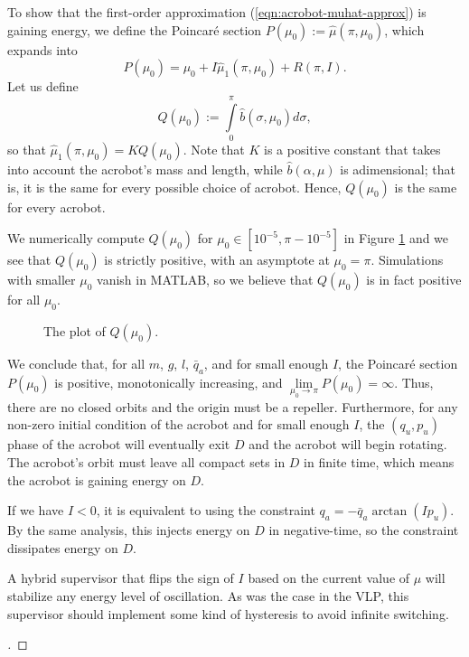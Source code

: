To show that the first-order approximation (\ref{eqn:acrobot-muhat-approx}) is
gaining energy, we define the Poincar\'{e} section 
\(P(\mu_0) := \hat{\mu}(\pi,\mu_0)\), which expands into
\[
    P(\mu_0) = \mu_0 + I \hat{\mu}_1(\pi,\mu_0) + R(\pi,I)
    .
\]
Let us define
\[
    Q(\mu_0) := \int \limits_0^\pi \hat{b}(\sigma,\mu_0)d\sigma
    ,
\]
so that \(\hat{\mu}_1(\pi,\mu_0) = K Q(\mu_0)\).
Note that \(K\) is a positive constant that takes into account the acrobot's
mass and length, while \(\hat{b}(\alpha,\mu)\) is adimensional;
that is, it is the same for every possible choice of acrobot.
Hence, \(Q(\mu_0)\) is the same for every acrobot.

We numerically compute \(Q(\mu_0)\) for \(\mu_0 \in [10^{-5}, \pi - 10^{-5}]\)
in Figure \ref{fig:acrobot-Q} and we see that \(Q(\mu_0)\) is strictly positive,
with an asymptote at \(\mu_0 = \pi\). 
Simulations with smaller \(\mu_0\) vanish in MATLAB, so we believe that 
\(Q(\mu_0)\) is in fact positive for all \(\mu_0\).

\begin{figure}
    \centering
    \caption{The plot of \(Q(\mu_0)\).}
    \label{fig:acrobot-Q}
\end{figure}

We conclude that, for all \(m\), \(g\), \(l\), \(\bar{q}_a\), and for small
enough \(I\), the Poincar\'{e} section \(P(\mu_0)\) is positive, monotonically
increasing, and \(\lim \limits_{\mu_0 \to \pi} P(\mu_0) = \infty\).
Thus, there are no closed orbits and the origin must be a repeller.
Furthermore, for any non-zero initial condition of the acrobot and for small
enough \(I\), the \((q_u,p_u)\) phase of the acrobot will eventually exit \(D\)
and the acrobot will begin rotating.
The acrobot's orbit must leave all compact sets in \(D\) in finite time, which
means the acrobot is gaining energy on \(D\).

If we have \(I < 0\), it is equivalent to using the constraint 
\(q_a = -\bar{q}_a \arctan(I p_u)\). 
By the same analysis, this injects energy on \(D\) in negative-time, so the
constraint dissipates energy on \(D\).

A hybrid supervisor that flips the sign of \(I\) based on the current
value of \(\mu\) will stabilize any energy level of oscillation.
As was the case in the VLP, this supervisor should implement some kind of
hysteresis to avoid infinite switching.
\begin{proof}[\unskip\nopunct]
\end{proof}

